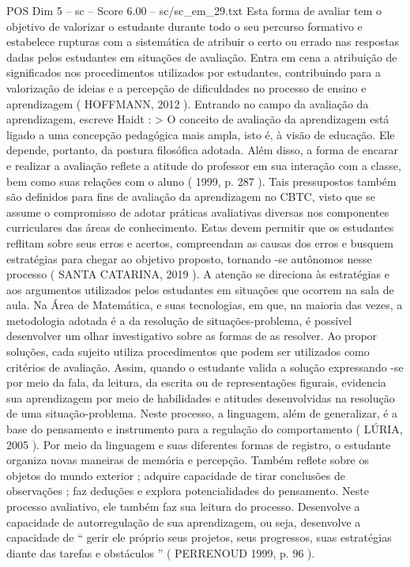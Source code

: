 \begin{textsample}{POS Dim 5 – sc – Score 6.00 – sc/sc\_em\_29.txt}
Esta forma de avaliar tem o objetivo de valorizar o estudante durante todo o seu percurso formativo e estabelece rupturas com a sistemática de atribuir o certo ou errado nas respostas dadas pelos estudantes em situações de avaliação.
Entra em cena a atribuição de significados nos procedimentos utilizados por estudantes, contribuindo para a valorização de ideias e a percepção de dificuldades no processo de ensino e aprendizagem ( HOFFMANN, 2012 ).
Entrando no campo da avaliação da aprendizagem, escreve Haidt : > O conceito de avaliação da aprendizagem está ligado a uma concepção pedagógica mais ampla, isto é, à visão de educação.
Ele depende, portanto, da postura filosófica adotada.
Além disso, a forma de encarar e realizar a avaliação reflete a atitude do professor em sua interação com a classe, bem como suas relações com o aluno ( 1999, p. 287 ).
Tais pressupostos também são definidos para fins de avaliação da aprendizagem no CBTC, visto que se assume o compromisso de adotar práticas avaliativas diversas nos componentes curriculares das áreas de conhecimento.
Estas devem permitir que os estudantes reflitam sobre seus erros e acertos, compreendam as causas dos erros e busquem estratégias para chegar ao objetivo proposto, tornando -se autônomos nesse processo ( SANTA CATARINA, 2019 ).
A atenção se direciona às estratégias e aos argumentos utilizados pelos estudantes em situações que ocorrem na sala de aula.
Na Área de Matemática, e suas tecnologias, em que, na maioria das vezes, a metodologia adotada é a da resolução de situações-problema, é possível desenvolver um olhar investigativo sobre as formas de as resolver.
Ao propor soluções, cada sujeito utiliza procedimentos que podem ser utilizados como critérios de avaliação.
Assim, quando o estudante valida a solução expressando -se por meio da fala, da leitura, da escrita ou de representações figurais, evidencia sua aprendizagem por meio de habilidades e atitudes desenvolvidas na resolução de uma situação-problema.
Neste processo, a linguagem, além de generalizar, é a base do pensamento e instrumento para a regulação do comportamento ( LÚRIA, 2005 ).
Por meio da linguagem e suas diferentes formas de registro, o estudante organiza novas maneiras de memória e percepção.
Também reflete sobre os objetos do mundo exterior ; adquire capacidade de tirar conclusões de observações ; faz deduções e explora potencialidades do pensamento.
Neste processo avaliativo, ele também faz sua leitura do processo.
Desenvolve a capacidade de autorregulação de sua aprendizagem, ou seja, desenvolve a capacidade de “ gerir ele próprio seus projetos, seus progressos, suas estratégias diante das tarefas e obstáculos ” ( PERRENOUD 1999, p. 96 ).

\end{textsample}
